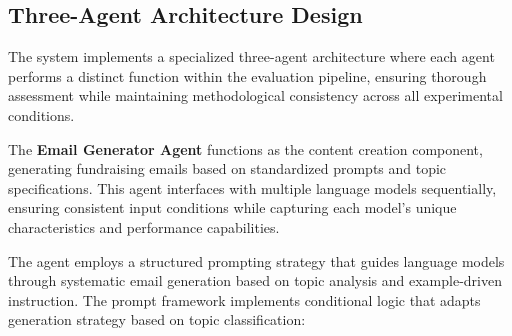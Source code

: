 \subsection{Three-Agent Architecture Design}

The system implements a specialized three-agent architecture where each agent performs a distinct function within the evaluation pipeline, ensuring thorough assessment while maintaining methodological consistency across all experimental conditions.

The \textbf{Email Generator Agent} functions as the content creation component, generating fundraising emails based on standardized prompts and topic specifications. This agent interfaces with multiple language models sequentially, ensuring consistent input conditions while capturing each model's unique characteristics and performance capabilities.

The agent employs a structured prompting strategy that guides language models through systematic email generation based on topic analysis and example-driven instruction. The prompt framework implements conditional logic that adapts generation strategy based on topic classification:

